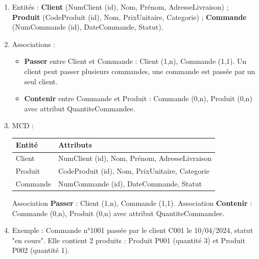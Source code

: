 \begin{enumerate}
    \item Entités : \textbf{Client} (NumClient (id), Nom, Prénom, AdresseLivraison) ; \textbf{Produit} (CodeProduit (id), Nom, PrixUnitaire, Categorie) ; \textbf{Commande} (NumCommande (id), DateCommande, Statut).
    \item Associations :
    \begin{itemize}
        \item \textbf{Passer} entre Client et Commande : Client (1,n), Commande (1,1). Un client peut passer plusieurs commandes, une commande est passée par un seul client.
        \item \textbf{Contenir} entre Commande et Produit : Commande (0,n), Produit (0,n) avec attribut QuantiteCommandee.
    \end{itemize}
    \item MCD :
    \begin{center}
    \begin{tabular}{|l|l|}
    \hline
    \textbf{Entité} & \textbf{Attributs} \\
    \hline
    Client & NumClient (id), Nom, Prénom, AdresseLivraison \\
    \hline
    Produit & CodeProduit (id), Nom, PrixUnitaire, Categorie \\
    \hline
    Commande & NumCommande (id), DateCommande, Statut \\
    \hline
    \end{tabular}
    \end{center}
    Association \textbf{Passer} : Client (1,n), Commande (1,1).
    Association \textbf{Contenir} : Commande (0,n), Produit (0,n) avec attribut QuantiteCommandee.
    \item Exemple : Commande n°1001 passée par le client C001 le 10/04/2024, statut "en cours". Elle contient 2 produits : Produit P001 (quantité 3) et Produit P002 (quantité 1).
\end{enumerate}


